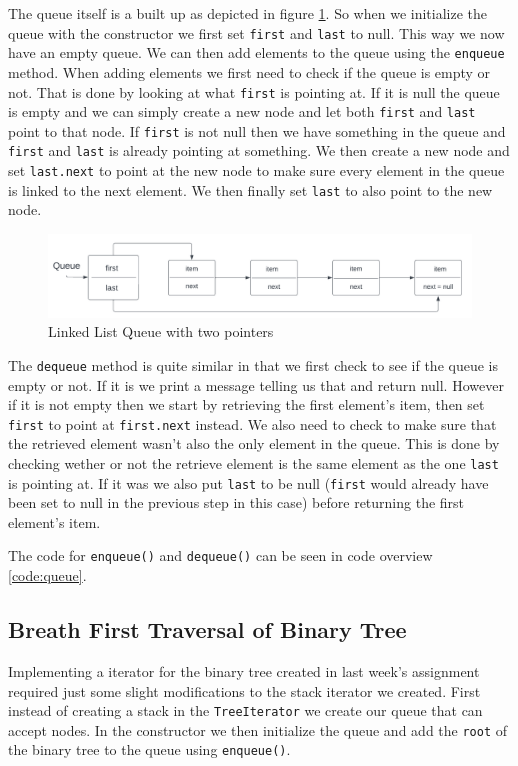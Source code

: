 \documentclass[a4paper,11pt]{article}
\begin{document}
The queue itself is a built up as depicted in figure \ref{fig:queue}. So when we initialize the queue with the constructor we first set {\tt first} and {\tt last}
to null. This way we now have an empty queue. We can then add elements to the queue using the {\tt enqueue} method. When adding elements we first need to check if
the queue is empty or not. That is done by looking at what {\tt first} is pointing at. If it is null the queue is empty and we can simply create a new node and let
both {\tt first} and {\tt last} point to that node. If {\tt first} is not null then we have something in the queue and {\tt first} and {\tt last} is already pointing
at something. We then create a new node and set {\tt last.next} to point at the new node to make sure every element in the queue is linked to the next element. We
then finally set {\tt last} to also point to the new node.
\begin{figure}[h!]
    \centering
    \includegraphics[width=\textwidth]{queue.pdf}
    \caption{Linked List Queue with two pointers}
    \label{fig:queue}
\end{figure}

The {\tt dequeue} method is quite similar in that we first check to see if the queue is empty or not. If it is we print a message telling us that and return null.
However if it is not empty then we start by retrieving the first element's item, then set {\tt first} to point at {\tt first.next} instead. We also need to check to
make sure that the retrieved element wasn't also the only element in the queue. This is done by checking wether or not the retrieve element is the same element as
the one {\tt last} is pointing at. If it was we also put {\tt last} to be null ({\tt first} would already have been set to null in the previous step in this case)
before returning the first element's item.

The code for {\tt enqueue()} and {\tt dequeue()} can be seen in code overview \ref{code:queue}.

\subsection{Breath First Traversal of Binary Tree}
Implementing a iterator for the binary tree created in last week's assignment required just some slight modifications to the stack iterator we created.
First instead of creating a stack in the {\tt TreeIterator} we create our queue that can accept nodes. In the constructor we then initialize the queue and
add the {\tt root} of the binary tree to the queue using {\tt enqueue()}.
\end{document}
